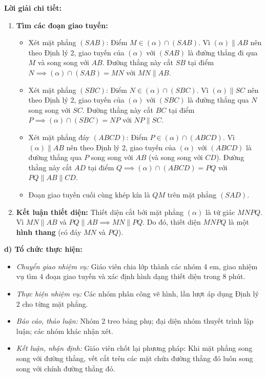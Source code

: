 \documentclass[12pt, a4paper]{article}
\begin{document}
\textbf{Lời giải chi tiết:}
\begin{enumerate}[leftmargin=0.6cm]
    \item \textbf{Tìm các đoạn giao tuyến:}
    \begin{itemize}
        \item Xét mặt phẳng $(SAB)$: Điểm $M \in (\alpha) \cap (SAB)$. Vì $(\alpha) \parallel AB$ nên theo Định lý 2, giao tuyến của $(\alpha)$ với $(SAB)$ là đường thẳng đi qua $M$ và song song với $AB$. Đường thẳng này cắt $SB$ tại điểm $N \implies (\alpha) \cap (SAB) = MN$ với $MN \parallel AB$.
        \item Xét mặt phẳng $(SBC)$: Điểm $N \in (\alpha) \cap (SBC)$. Vì $(\alpha) \parallel SC$ nên theo Định lý 2, giao tuyến của $(\alpha)$ với $(SBC)$ là đường thẳng qua $N$ song song với $SC$. Đường thẳng này cắt $BC$ tại điểm $P \implies (\alpha) \cap (SBC) = NP$ với $NP \parallel SC$.
        \item Xét mặt phẳng đáy $(ABCD)$: Điểm $P \in (\alpha) \cap (ABCD)$. Vì $(\alpha) \parallel AB$ nên theo Định lý 2, giao tuyến của $(\alpha)$ với $(ABCD)$ là đường thẳng qua $P$ song song với $AB$ (và song song với $CD$). Đường thẳng này cắt $AD$ tại điểm $Q \implies (\alpha) \cap (ABCD) = PQ$ với $PQ \parallel AB \parallel CD$.
        \item Đoạn giao tuyến cuối cùng khép kín là $QM$ trên mặt phẳng $(SAD)$.
    \end{itemize}

    \item \textbf{Kết luận thiết diện:}
    Thiết diện cắt bởi mặt phẳng $(\alpha)$ là tứ giác $MNPQ$.
    Vì $MN \parallel AB$ và $PQ \parallel AB \implies MN \parallel PQ$.
    Do đó, thiết diện $MNPQ$ là một \textbf{hình thang} (có đáy $MN$ và $PQ$).
\end{enumerate}

\noindent \textbf{d) Tổ chức thực hiện:}
\begin{itemize}[leftmargin=0.8cm]
    \item \textit{Chuyển giao nhiệm vụ:} Giáo viên chia lớp thành các nhóm 4 em, giao nhiệm vụ tìm 4 đoạn giao tuyến và xác định hình dạng thiết diện trong 8 phút.
    \item \textit{Thực hiện nhiệm vụ:} Các nhóm phân công vẽ hình, lần lượt áp dụng Định lý 2 cho từng mặt phẳng.
    \item \textit{Báo cáo, thảo luận:} Nhóm 2 treo bảng phụ; đại diện nhóm thuyết trình lập luận; các nhóm khác nhận xét.
    \item \textit{Kết luận, nhận định:} Giáo viên chốt lại phương pháp: Khi mặt phẳng song song với đường thẳng, vết cắt trên các mặt chứa đường thẳng đó luôn song song với chính đường thẳng đó.
\end{itemize}
\end{document}
